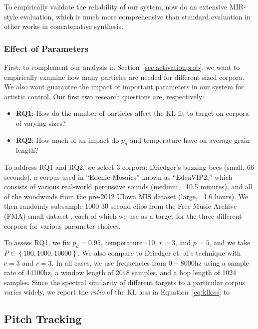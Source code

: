 \documentclass{article}
\begin{document}
To empirically validate the reliability of our system, now do an extensive MIR-style evaluation, which is much more comprehensive than standard evaluation in other works in concatenative synthesis.

\subsubsection{Effect of Parameters}
\label{sec:quantitativeparams}

First, to complement our analysis in Section~\ref{sec:activationprob}, we want to empirically examine how many particles are needed for different sized corpora.  We also want guarantee the impact of important parameters in our system for artistic control.  Our first two research questions are, respectively:

\begin{itemize}
    \item \textbf{RQ1}: How do the number of particles affect the KL fit to target on corpora of varying sizes?
    \item \textbf{RQ2}: How much of an impact do $p_d$ and temperature have on average grain length?
\end{itemize}

To address RQ1 and RQ2, we select 3 corpora: Driedger's buzzing bees (small, 66 seconds), a corpus used in ``Edenic Mosaics''\cite{cantil2021} known as ``EdenVIP2,'' which consists of various real-world percussive sounds (medium, ~10.5 minutes), and all of the woodwinds from the pre-2012 UIowa MIS dataset \cite{uiowadataset} (large, ~1.6 hours).  We then randomly subsample 1000 30 second clips from the Free Music Archive (FMA)-small dataset \cite{fma_dataset}, each of which we use as a target for the three different corpora for various parameter choices.

To assess RQ1, we fix $p_d=0.95$, temperature=10, $r=3$, and $p=5$, and we take $P \in \left\{ 100, 1000, 10000 \right\}$.  We also compare to Driedger et. al's technique with $c=3$ and $r=3$.  In all cases, we use frequencies from $0-8000$hz using a sample rate of 44100hz, a window length of 2048 samples, and a hop length of 1024 samples.  Since the spectral similarity of different targets to a particular corpus varies widely, we report the {\em ratio} of the KL loss in Equation~\ref{eq:klloss} to 


\subsection{Pitch Tracking}
\label{sec:quantitativepitch}
\end{document}
